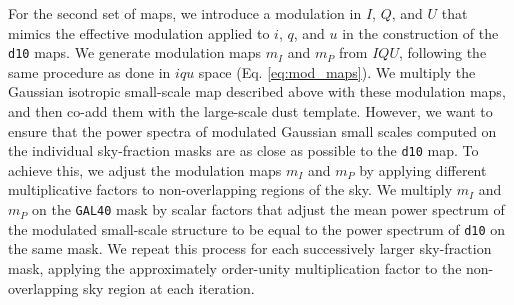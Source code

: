 \documentclass[twocolumn]{aastex631}
\begin{document}


For the second set of maps, we introduce a modulation in $I$, $Q$, and $U$ that mimics the effective modulation applied to $i$, $q$, and $u$ in the construction of the \texttt{d10} maps. We generate modulation maps $m_I$ and $m_P$ from $IQU$, following the same procedure as done in $iqu$ space (Eq. \ref{eq:mod_maps}). We multiply the Gaussian isotropic small-scale map described above with these modulation maps, and then co-add them with the large-scale dust template. However, we want to ensure that the power spectra of modulated Gaussian small scales computed on the individual sky-fraction masks are as close as possible to the \texttt{d10} map. To achieve this, we adjust the modulation maps $m_I$ and $m_P$ by applying different multiplicative factors to non-overlapping regions of the sky. We multiply $m_I$ and $m_P$ on the \texttt{GAL40} mask by scalar factors that adjust the mean power spectrum of the modulated small-scale structure to be equal to the power spectrum of \texttt{d10} on the same mask. We repeat this process for each successively larger sky-fraction mask, applying the approximately order-unity multiplication factor to the non-overlapping sky region at each iteration. 





\end{document}
